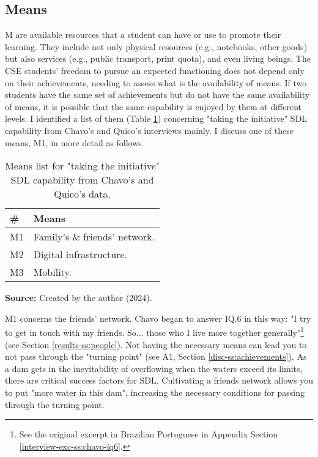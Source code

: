 \subsection{Means}
\label{disc-ss:means}

\gls{M} are available resources that a student can have or use to promote their learning. They include not only physical resources (e.g., notebooks, other goods) but also services (e.g., public transport, print quota), and even living beings. The \gls{CSE} students' freedom to pursue an expected functioning does not depend only on their achievements, needing to assess what is the availability of means. If two students have the same set of achievements but do not have the same availability of means, it is possible that the same capability is enjoyed by them at different levels. I identified a list of them (Table \ref{tbl:means-list}) concerning "taking the initiative" \gls{SDL} capability from Chavo's and Quico's interviews mainly. I discuss one of these means, \gls{M}1, in more detail as follows.

\begin{table}[ht]
\caption{Means list for "taking the initiative" \acrshort{SDL} capability from Chavo's and Quico's data.}
\label{tbl:means-list}
\centering
{}
\begin{tabular}{p{0.5cm}p{5cm}}
\hline
\textbf{\#} &
\textbf{Means}\\
\hline     
M1 &
Family's \& friends' network.\\
M2 & 
Digital infrastructure. \\
M3 &
Mobility. \\
\hline

\end{tabular}
\par\medskip\ABNTEXfontereduzida\selectfont\textbf{Source:} Created by the author (2024). \par\medskip
\end{table}

\gls{M}1 concerns the friends' network. Chavo began to answer \gls{IQ}.6 in this way: "I try to get in touch with my friends. So... those who I live more together generally"\footnote{See the original excerpt in Brazilian Portuguese in Appendix Section \ref{interview-exc-ss:chavo-iq6}.} (see Section \ref{results-ss:people}). Not having the necessary means can lead you to not pass through the "turning point" (see \gls{A}1, Section \ref{disc-ss:achievements}). As a dam gets in the inevitability of overflowing when the waters exceed its limits, there are critical success factors for \gls{SDL}. Cultivating a friends network allows you to put "more water in this dam", increasing the necessary conditions for passing through the turning point.

